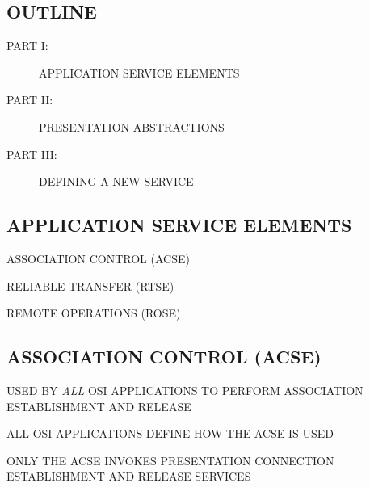 

\begin{bwslide}
\part*	{OUTLINE}\bf

\begin{description}
\item[PART I:]	APPLICATION SERVICE ELEMENTS

\item[PART II:]	PRESENTATION ABSTRACTIONS

\item[PART III:] DEFINING A NEW SERVICE
\end{description}
\end{bwslide}


\begin{bwslide}
\part	{APPLICATION SERVICE ELEMENTS}\bf

\begin{nrtc}
\item	ASSOCIATION CONTROL (ACSE)

\item	RELIABLE TRANSFER (RTSE)

\item	REMOTE OPERATIONS (ROSE)
\end{nrtc}
\end{bwslide}


\begin{bwslide}
\part*	{ASSOCIATION CONTROL (ACSE)}\bf

\begin{nrtc}
\item	USED BY \emph{ALL} OSI APPLICATIONS TO PERFORM ASSOCIATION
	ESTABLISHMENT AND RELEASE

\item	ALL OSI APPLICATIONS DEFINE HOW THE ACSE IS USED

\item	ONLY THE ACSE INVOKES PRESENTATION CONNECTION ESTABLISHMENT AND
	RELEASE SERVICES
\end{nrtc}
\end{bwslide}


